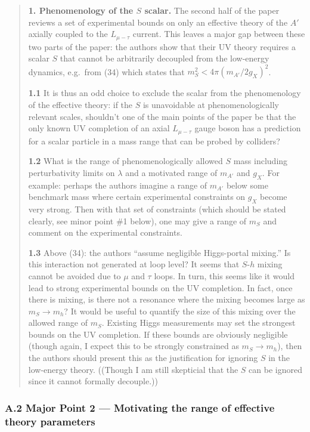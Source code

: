 \documentclass[
  chinese,
  UTF8]{ctexart}
\begin{document}
\begin{quote}
\textbf{1. Phenomenology of the \(S\) scalar.} The second half of the
paper reviews a set of experimental bounds on only an effective theory
of the \(A'\) axially coupled to the \(L_{\mu-\tau}\) current. This
leaves a major gap between these two parts of the paper: the authors
show that their UV theory requires a scalar \(S\) that cannot be
arbitrarily decoupled from the low-energy dynamics, e.g.~from (34) which
states that \(m_S^2<4\pi(m_{A'}/2g_X)^2\).

\textbf{1.1} It is thus an odd choice to exclude the scalar from the
phenomenology of the effective theory: if the \(S\) is unavoidable at
phenomenologically relevant scales, shouldn't one of the main points of
the paper be that the only known UV completion of an axial
\(L_{\mu-\tau}\) gauge boson has a prediction for a scalar particle in a
mass range that can be probed by colliders?

\textbf{1.2} What is the range of phenomenologically allowed \(S\) mass
including perturbativity limits on \(\lambda\) and a motivated range of
\(m_{A'}\) and \(g_X\). For example: perhaps the authors imagine a range
of \(m_{A'}\) below some benchmark mass where certain experimental
constraints on \(g_X\) become very strong. Then with that set of
constraints (which should be stated clearly, see minor point \#1 below),
one may give a range of \(m_S\) and comment on the experimental
constraints.

\textbf{1.3} Above (34): the authors ``assume negligible Higgs-portal
mixing.'' Is this interaction not generated at loop level? It seems that
\(S\)-\(h\) mixing cannot be avoided due to \(\mu\) and \(\tau\) loops.
In turn, this seems like it would lead to strong experimental bounds on
the UV completion. In fact, once there is mixing, is there not a
resonance where the mixing becomes large as \(m_S\to m_h\)? It would be
useful to quantify the size of this mixing over the allowed range of
\(m_S\). Existing Higgs measurements may set the strongest bounds on the
UV completion. If these bounds are obviously negligible (though again, I
expect this to be strongly constrained as \(m_S\to m_h\)), then the
authors should present this as the justification for ignoring \(S\) in
the low-energy theory. ((Though I am still skepticial that the \(S\) can
be ignored since it cannot formally decouple.))
\end{quote}

\subsubsection{A.2 Major Point 2 --- Motivating the range of effective
theory
parameters}\label{a.2-major-point-2-motivating-the-range-of-effective-theory-parameters}
\end{document}
